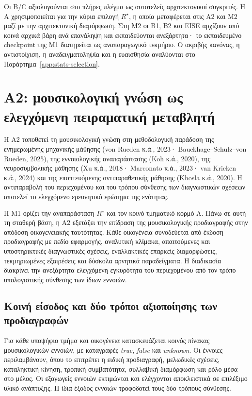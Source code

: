 \documentclass[11pt,a4paper]{article}
\begin{document}
Οι B/C αξιολογούνται στο πλήρες πλέγμα ως αυτοτελείς αρχιτεκτονικοί συγκριτές. Η A χρησιμοποιείται για την κύρια επιλογή $R^\star$, η οποία μεταφέρεται στις Α2 και Μ2 μαζί με την αρχιτεκτονική διαμόρφωση. Στη Μ2 οι B1, B2 και EISE αρχίζουν από κοινά αρχικά βάρη ανά επανάληψη και εκπαιδεύονται ανεξάρτητα· το εκπαιδευμένο checkpoint της Μ1 διατηρείται ως αναπαραγωγικό τεκμήριο. Ο ακριβής κανόνας, η αντιστοίχιση, η αναδειγματοληψία και η ευαισθησία αναλύονται στο Παράρτημα~\ref{app:stats-selection}.

\section{Α2: μουσικολογική γνώση ως ελεγχόμενη πειραματική μεταβλητή}\label{sec:a2}

Η Α2 τοποθετεί τη μουσικολογική γνώση στη μεθοδολογική παράδοση της ενημερωμένης μηχανικής μάθησης (von Rueden κ.ά., 2023· Bauckhage--Schulz--von Rueden, 2025), της εννοιολογικής αναπαράστασης (Koh κ.ά., 2020), της νευροσυμβολικής μάθησης (Xu κ.ά., 2018· Marconato κ.ά., 2023· van Krieken κ.ά., 2024) και της εποπτευόμενης αντιπαραθετικής μάθησης (Khosla κ.ά., 2020). Η αντιπαραβολή του περιεχομένου και του τρόπου σύνθεσης των διαγνωστικών σχέσεων αποτελεί το ελεγχόμενο ερευνητικό ερώτημα της ενότητας.\par

Η Μ1 ορίζει την αναπαράσταση $R^\star$ και τον κοινό τμηματικό κορμό A. Πάνω σε αυτή τη σταθερή βάση, η Α2 εξετάζει την επίδραση της μουσικολογικής προδιαγραφής στην απόδοση οικογενειακής ταυτότητας. Κάθε οικογένεια συνοδεύεται από έκδοση προδιαγραφής με πεδίο εφαρμογής, αναλυτική κλίμακα, απαιτούμενες και υποστηρικτικές διαγνωστικές σχέσεις, εναλλακτικές επαρκείς διαμορφώσεις, τεκμηριωμένες εξαιρέσεις και δύσκολα αρνητικά παραδείγματα. Η διαδικασία διακρίνει την ανεξάρτητα ελεγχόμενη εγκυρότητα του περιεχομένου από τον τρόπο υπολογιστικής σύνθεσης των ίδιων εννοιών.

\subsection{Κοινή είσοδος και δύο τρόποι αξιοποίησης των προδιαγραφών}

Για κάθε υποψήφιο τμήμα και οικογένεια κατασκευάζεται κοινός πίνακας μουσικολογικών εννοιών, με καταγραφές \emph{true}, \emph{false} και \emph{unknown}. Οι έννοιες περιλαμβάνουν, όπου το επιτρέπει η ειδική προδιαγραφή, μελωδικές σχέσεις, καταληκτική κίνηση, τροπική συμβατότητα, συλλαβική διαμόρφωση και ρόλο μέσα στο μέλος. Οι εξαγωγείς εννοιών εκτιμώνται και ελέγχονται αποκλειστικά σε επιλέξιμο υλικό ανάπτυξης. Η ίδια έξοδος εννοιών τροφοδοτεί τους δύο τρόπους σύνθεσης.
\end{document}

